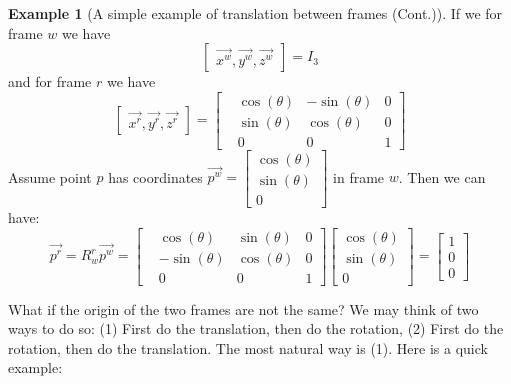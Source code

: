 \documentclass[
]{book}
\theoremstyle{definition}
\theoremstyle{definition}
\newtheorem{example}{Example}[chapter]
\theoremstyle{definition}
\theoremstyle{definition}
\theoremstyle{remark}
\begin{document}
\begin{example}[A simple example of translation between frames (Cont.)]
\protect\hypertarget{exm:frametransexamplecont}{}\label{exm:frametransexamplecont}If we for frame \(w\) we have \[\begin{bmatrix}
    \vec{x^w},\vec{y^w},\vec{z^w}
\end{bmatrix} = I_3\]
and for frame \(r\) we have \[\begin{bmatrix}
    \vec{x^r},\vec{y^r},\vec{z^r}
\end{bmatrix} = \begin{bmatrix}
    &\cos(\theta) &-\sin(\theta) &0\\
    &\sin(\theta) &\cos(\theta)  &0\\
    &0            &0             &1
\end{bmatrix}\]
Assume point \(p\) has coordinates \(\vec{p^w} = \begin{bmatrix} \cos(\theta)\\\sin(\theta)\\0 \end{bmatrix}\) in frame \(w\). Then we can have:
\[\vec{p^r} = R^r_w\vec{p^w} = \begin{bmatrix}
    &\cos(\theta) &\sin(\theta) &0\\
    &-\sin(\theta) &\cos(\theta) &0\\
    &0 &0 &1
\end{bmatrix}\begin{bmatrix} \cos(\theta)\\\sin(\theta)\\0 \end{bmatrix} = \begin{bmatrix} 1\\0\\0 \end{bmatrix}\]
\end{example}

What if the origin of the two frames are not the same? We may think of two ways to do so: (1) First do the translation, then do the rotation, (2) First do the rotation, then do the translation. The most natural way is (1). Here is a quick example:
\end{document}
